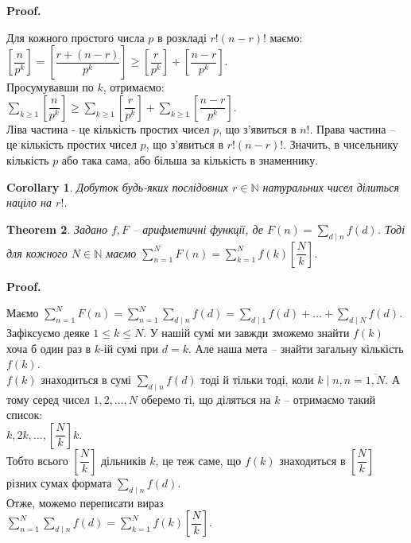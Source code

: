 \documentclass[a4paper, 14pt]{extarticle}
\makeatletter
\theoremstyle{theoremdd}
\newtheorem{theorem}{Theorem}[subsection]
\theoremstyle{theoremdd}
\theoremstyle{theoremdd}
\theoremstyle{theoremdd}
\theoremstyle{theoremdd}
\theoremstyle{theoremdd}
\theoremstyle{theoremdd}
\theoremstyle{theoremdd}
\newtheorem{corollary}[theorem]{Corollary}
\def\qed{$\blacksquare$}
\renewenvironment{proof}[1][Proof.\\]{\par
\pushQED{\hfill \qed}%
\normalfont \topsep6\p@\@plus6\p@\relax
\trivlist
\item\relax
{\bfseries
#1\@addpunct{.}}\hspace\labelsep\ignorespaces
}{%
\popQED\endtrivlist\@endpefalse
}
\makeatother
\begin{document}
\begin{proof}
Для кожного простого числа $p$ в розкладі $r!(n-r)!$ маємо:\\
$\left[ \dfrac{n}{p^k} \right] = \left[ \dfrac{r+(n-r)}{p^k} \right] \geq \left[ \dfrac{r}{p^k} \right] + \left[ \dfrac{n-r}{p^k} \right]$.\\
Просумувавши по $k$, отримаємо:\\
$\displaystyle\sum_{k \geq 1}\left[ \dfrac{n}{p^k} \right] \geq \sum_{k \geq 1}\left[ \dfrac{r}{p^k} \right] + \sum_{k \geq 1}\left[ \dfrac{n-r}{p^k} \right]$.\\
Ліва частина - це кількість простих чисел $p$, що з'явиться в $n!$. Права частина -- це кількість простих чисел $p$, що з'явиться в $r!(n-r)!$. Значить, в чисельнику кількість $p$ або така сама, або більша за кількість в знаменнику.
\end{proof}

\begin{corollary}
Добуток будь-яких послідовних $r \in \mathbb{N}$ натуральних чисел ділиться націло на $r!$.
\end{corollary}

\begin{theorem}
Задано $f,F$ -- арифметичні функції, де $F(n) = \displaystyle\sum_{d \mid n} f(d)$. Тоді для кожного $N \in \mathbb{N}$ маємо $\displaystyle\sum_{n=1}^N F(n) = \sum_{k=1}^N f(k) \left[ \dfrac{N}{k} \right]$.
\end{theorem}

\begin{proof}
Маємо $\displaystyle\sum_{n=1}^N F(n) = \sum_{n=1}^N \sum_{d \mid n} f(d) = \sum_{d \mid 1} f(d) + \dots + \sum_{d \mid N}f(d)$.\\
Зафіксуємо деяке $1 \leq k \leq N$. У нашій сумі ми завжди зможемо знайти $f(k)$ хоча б один раз в $k$-ій сумі при $d = k$. Але наша мета -- знайти загальну кількість $f(k)$.\\
$f(k)$ знаходиться в сумі $\displaystyle\sum_{d \mid n} f(d)$ тоді й тільки тоді, коли $k \mid n, n = \overline{1,N}$. А тому серед чисел $1,2,\dots,N$ оберемо ті, що діляться на $k$ -- отримаємо такий список:\\
$k,2k,\dots,\left[ \dfrac{N}{k} \right]k$.\\
Тобто всього $\left[ \dfrac{N}{k} \right]$ дільників $k$, це теж саме, що $f(k)$ знаходиться в $\left[ \dfrac{N}{k} \right]$ різних сумах формата $\displaystyle\sum_{d \mid n} f(d)$.\\
Отже, можемо переписати вираз\\
$\displaystyle\sum_{n=1}^N \sum_{d \mid n}f(d) = \sum_{k=1}^N f(k) \left[ \dfrac{N}{k} \right]$.
\end{proof}
\end{document}
